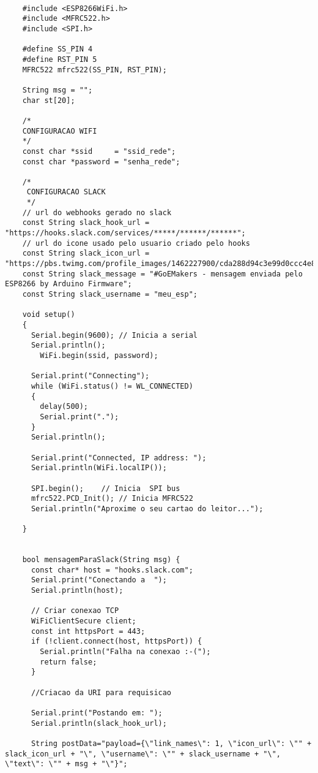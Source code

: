 \documentclass[
	11pt,				%
	openright,			%
	twoside,			%
	a5paper,			%
	english,			%
	french,				%
	spanish,			%
	brazil,				%
	sumario=tradicional
]{abntex2}
\begin{document}
\begin{lstlisting}

    #include <ESP8266WiFi.h>
    #include <MFRC522.h>
    #include <SPI.h>
    
    #define SS_PIN 4
    #define RST_PIN 5
    MFRC522 mfrc522(SS_PIN, RST_PIN);
    
    String msg = "";
    char st[20];
    
    /*
    CONFIGURACAO WIFI
    */
    const char *ssid     = "ssid_rede";
    const char *password = "senha_rede";
    
    /*
     CONFIGURACAO SLACK
     */
    // url do webhooks gerado no slack
    const String slack_hook_url = "https://hooks.slack.com/services/*****/******/******";
    // url do icone usado pelo usuario criado pelo hooks
    const String slack_icon_url = "https://pbs.twimg.com/profile_images/1462227900/cda288d94c3e99d0ccc4e8d1c61d7073_normal.jpg";
    const String slack_message = "#GoEMakers - mensagem enviada pelo ESP8266 by Arduino Firmware";
    const String slack_username = "meu_esp";
    
    void setup() 
    {
      Serial.begin(9600); // Inicia a serial
      Serial.println();
        WiFi.begin(ssid, password);
    
      Serial.print("Connecting");
      while (WiFi.status() != WL_CONNECTED)
      {
        delay(500);
        Serial.print(".");
      }
      Serial.println();
    
      Serial.print("Connected, IP address: ");
      Serial.println(WiFi.localIP());
    
      SPI.begin();    // Inicia  SPI bus
      mfrc522.PCD_Init(); // Inicia MFRC522
      Serial.println("Aproxime o seu cartao do leitor...");
    
    }
    
    
    bool mensagemParaSlack(String msg) {
      const char* host = "hooks.slack.com";
      Serial.print("Conectando a  ");
      Serial.println(host);
    
      // Criar conexao TCP
      WiFiClientSecure client;
      const int httpsPort = 443;
      if (!client.connect(host, httpsPort)) {
        Serial.println("Falha na conexao :-(");
        return false;
      }
    
      //Criacao da URI para requisicao
    
      Serial.print("Postando em: ");
      Serial.println(slack_hook_url);
    
      String postData="payload={\"link_names\": 1, \"icon_url\": \"" + slack_icon_url + "\", \"username\": \"" + slack_username + "\", \"text\": \"" + msg + "\"}";
    

\end{lstlisting}
\end{document}
